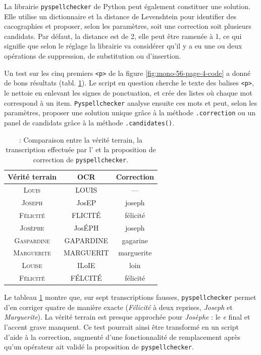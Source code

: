 La librairie \texttt{pyspellchecker} de Python peut également constituer une solution. Elle utilise un dictionnaire et la distance de Levenshtein pour identifier des cacographies et proposer, selon les paramètres, soit une correction soit plusieurs candidats. Par défaut, la distance est de 2, elle peut être ramenée à 1, ce qui signifie que selon le réglage la librairie va considérer qu'il y a eu une ou deux opérations de suppression, de substitution ou d'insertion.

Un test sur les cinq premiers \texttt{<p>} de la figure \ref{fig:mono-56-page-4-code} a donné de bons résultats (tabl. \ref{tabl:pyspellchecker}). Le script en question cherche le texte des balises \texttt{<p>}, le nettoie en enlevant les signes de ponctuation, et crée des listes où chaque mot correspond à un item. \texttt{Pyspellchecker} analyse ensuite ces mots et peut, selon les paramètres, proposer une solution unique grâce à la méthode \texttt{.correction{}} ou un panel de candidats grâce à la méthode \texttt{.candidates()}.

\begin{table}
    \begin{tabular}{|c|c|c|}
\hline
    Vérité terrain & OCR & Correction \\ \hline
    \textsc{Louis} & LOUIS & --- \\ \hline
    \textsc{Joseph} & JosEP & joseph \\ \hline
    \textsc{Félicité} & FLICITÉ & félicité \\ \hline
    \textsc{Josèphe} & JosÉPH & joseph \\ \hline
    \textsc{Gaspardine} & GAPARDINE & gagarine \\ \hline
    \textsc{Marguerite} & MARGUERIT & marguerite \\ \hline
    \textsc{Louise} & ILoIE & loin \\ \hline
    \textsc{Félicité} & FÉLCITÉ & félicité \\ \hline
    \end{tabular}
\caption{\label{tabl:pyspellchecker} : Comparaison entre la vérité terrain, la transcription effectuée par l'\ocr{} et la proposition de correction de \texttt{pyspellchecker}.}
\end{table}

Le tableau \ref{tabl:pyspellchecker} montre que, sur sept transcriptions fausses, \texttt{pyspellchecker} permet d'en corriger quatre de manière exacte (\textit{Félicité} à deux reprises, \textit{Joseph} et \textit{Marguerite}). La vérité terrain est presque approchée pour \textit{Josèphe} : le \textit{e} final et l'accent grave manquent. Ce test pourrait ainsi être transformé en un script d'aide à la correction, augmenté d'une fonctionnalité de remplacement après qu'un opérateur ait validé la proposition de \texttt{pyspellchecker}.

